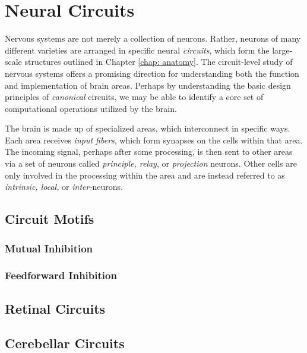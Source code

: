 \chapter{Neural Circuits}

Nervous systems are not merely a collection of neurons. Rather, neurons of many different varieties are arranged in specific neural \textit{circuits}, which form the large-scale structures outlined in Chapter \ref{chap: anatomy}. The circuit-level study of nervous systems offers a promising direction for understanding both the function and implementation of brain areas. Perhaps by understanding the basic design principles of \textit{canonical} circuits, we may be able to identify a core set of computational operations utilized by the brain.

The brain is made up of specialized areas, which interconnect in specific ways. Each area receives \textit{input fibers}, which form synapses on the cells within that area. The incoming signal, perhaps after some processing, is then sent to other areas via a set of neurons called \textit{principle, relay}, or \textit{projection} neurons. Other cells are only involved in the processing within the area and are instead referred to as \textit{intrinsic, local,} or \textit{inter-}neurons. 


\section{Circuit Motifs}

\subsection{Mutual Inhibition}


\subsection{Feedforward Inhibition}







\section{Retinal Circuits}


\section{Cerebellar Circuits}


